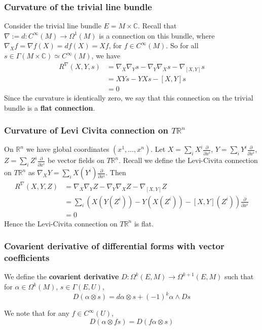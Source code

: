 \documentclass[a4paper]{article}
\theoremstyle{definition} \newtheorem*{definition}{Definition}
\theoremstyle{definition} \newtheorem*{definitions}{Definitions}
\theoremstyle{plain} \newtheorem{theorem}{Theorem}[section]
\theoremstyle{plain} \newtheorem{proposition}[theorem]{Proposition}
\theoremstyle{plain} \newtheorem{corollary}[theorem]{Corollary}
\theoremstyle{plain} \newtheorem{lemma}[theorem]{Lemma}
\theoremstyle{plain} \newtheorem{example}[theorem]{Example}
\newcommand{\defn}[1]{\textbf{#1}}
\newcommand{\realnos}{\mathbb{R}}
\newcommand{\complexnos}{\mathbb{C}}
\newcommand{\smooth}{C^\infty}
\begin{document}
\subsubsection{Curvature of the trivial line bundle}
Consider the trivial line bundle $E=M\times \complexnos$. Recall that $\nabla:=d:\smooth(M)\to \Omega^1(M)$ is a connection on this bundle, where $\nabla_X f = \nabla f(X) = df(X) = Xf$, for $f\in \smooth(M)$. 
So for all $s\in \Gamma(M\times \complexnos)\simeq \smooth(M)$, we have
\begin{align*}
    R^\nabla(X, Y, s) & = \nabla_X \nabla_Y s - \nabla_Y \nabla_X s - \nabla_{[X, Y]}s \\
    & = XYs - YXs - [X, Y]s \\
    & = 0
\end{align*}
Since the curvature is identically zero, we say that this connection on the trivial bundle is a \defn{flat connection}.

\subsubsection{Curvature of Levi Civita connection on $T\realnos^n$}
On $\realnos^n$ we have global coordinates $(x^1, \ldots, x^n)$. 
Let
$X=\sum_i X^i \frac{\partial}{\partial x^i}$, $Y=\sum_i Y^i \frac{\partial}{\partial x^i}$, $Z=\sum_i Z^i \frac{\partial}{\partial x^i}$ be vector fields on $T\realnos^n$. 
Recall we define the Levi-Civita connection on $T\realnos^n$ as
$\nabla_X Y = \sum_i X(Y^i) \frac{\partial}{\partial x^i}$. Then 
\begin{align*}
      R^\nabla(X, Y, Z) & = \nabla_X \nabla_Y Z - \nabla_Y \nabla_X Z - \nabla_{[X, Y]} Z \\
      & = \sum_i (X(Y(Z^i))-Y(X(Z^i))-[X, Y](Z^i))\frac{\partial}{\partial x^i} \\
      & = 0
\end{align*}
Hence the Levi-Civita connection on $T\realnos^n$ is flat. 

\subsubsection{Covarient derivative of differential forms with vector coefficients}
We define the \defn{covarient derivative} $D:\Omega^k(E, M)\to \Omega^{k+1}(E, M)$ such that for $\alpha\in \Omega^k(M)$, $s\in \Gamma(E, U)$,
$$D(\alpha \otimes s)=d\alpha \otimes s + (-1)^k \alpha \wedge Ds$$

We note that for any $f\in \smooth(U)$,
$$D(\alpha \otimes fs) = D (f\alpha \otimes s)$$
\end{document}
